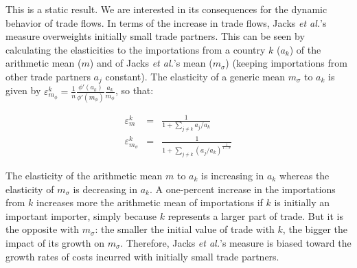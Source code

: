 \documentclass{article}
\begin{document}
This is a static result. We are interested in its consequences for the dynamic
behavior of trade flows. In terms of the
increase in trade flows, Jacks \textit{et al.}'s measure
overweights initially small trade partners. This can be seen by calculating the
elasticities to the importations from a country $k$ ($a_k$) of
the arithmetic mean ($m$) and of Jacks \textit{et al.}'s mean
($m_{\sigma}$) (keeping importations from other trade partners
$a_j$ constant). The elasticity of a generic mean $m_\sigma$ to
$a_k$ is given by
\mbox{$\varepsilon_{m_{\phi}}^k=\frac{1}{n}\frac{\phi'(a_k)}{\phi'(m_{\phi})}\frac{a_k}{m_{\phi}}$},
so that:

\begin{eqnarray*}
\varepsilon_m^k&=& \frac{1}{1+\sum\limits_{j \neq k} a_j/a_k}\\
\varepsilon_{m_{\sigma}}^k&=&\frac{1}{1+\sum\limits_{j\neq k} (a_j/a_k)^{\frac{1}{1-\sigma}}}
\end{eqnarray*}

The elasticity of the arithmetic mean $m$ to $a_k$ is
increasing in $a_k$ whereas the elasticity of $m_{\sigma}$ is
decreasing in $a_k$. A one-percent increase in the importations
from $k$ increases more the arithmetic mean of importations if
$k$ is initially an important importer, simply because $k$
represents a larger part of trade. But it is the opposite with
$m_{\sigma}$: the smaller the initial value of trade with $k$,
the bigger the impact of its growth on $m_{\sigma}$. Therefore,
Jacks \textit{et al.}'s measure is biased toward the growth rates of
costs incurred with initially small trade partners.



\end{document}
